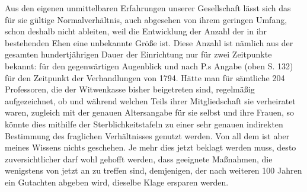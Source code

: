 Aus den eigenen unmittelbaren Erfahrungen unserer Gesellschaft lässt sich das für sie gültige Normalverhältnis, auch abgesehen von ihrem geringen Umfang, schon deshalb nicht ableiten, weil die Entwicklung der Anzahl der in ihr bestehenden Ehen eine unbekannte Größe ist. Diese Anzahl ist nämlich aus der gesamten hundertjährigen Dauer der Einrichtung nur für zwei Zeitpunkte bekannt: für den gegenwärtigen Augenblick und nach P.s Angabe (oben S. 132) für den Zeitpunkt der Verhandlungen
von 1794. Hätte man für sämtliche 204 Professoren, die der Witwenkasse bisher beigetreten sind, regelmäßig aufgezeichnet, ob und während welchen Teils ihrer Mitgliedschaft sie verheiratet waren, zugleich mit der genauen Altersangabe für sie selbst und ihre Frauen, so könnte dies mithilfe der Sterblichkeitstafeln zu einer sehr genauen indirekten Bestimmung des fraglichen Verhältnisses genutzt werden. Von all dem ist aber meines Wissens nichts geschehen. Je mehr dies jetzt beklagt werden muss, desto zuversichtlicher darf wohl gehofft werden, dass geeignete Maßnahmen, die wenigstens von jetzt an zu treffen sind, demjenigen, der nach weiteren 100 Jahren ein Gutachten abgeben wird, dieselbe Klage ersparen werden.

